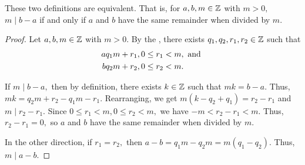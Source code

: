 \documentclass{ximera}
\begin{document}
\begin{proposition}\label{prop:mod-defn:equiv}
These two definitions are equivalent. That is, for $a,b,m\in\mathbb Z$ with $m>0,$ $m\mid b-a$ if and only if $a$ and $b$ have the same remainder when divided by $m$.
\end{proposition}

\begin{proof}
Let $a,b,m\in\mathbb Z$ with $m> 0.$ By the , there exists $q_1,q_2,r_1,r_2\in\mathbb Z$ such that \begin{align*}
                    a & q_1 m +r_1, 0\leq r_1< m, \textnormal{ and }\\
                    b & q_2 m +r_2, 0\leq r_2< m.
                \end{align*}
            
            
                If $m\mid b-a,$ then by definition, there exists $k\in\mathbb Z$ such that $mk=b-a.$ Thus, $mk=q_2 m+r_2-q_1 m-r_1.$ Rearranging, we get 
                $m(k-q_2+q_1)=r_2-r_1$ and $m\mid r_2-r_1.$ Since 
                $0\leq r_1< m, 0\leq r_2< m,$ we have 
                $-m< r_2-r_1< m.$ Thus, $r_2-r_1=0,$ so $a$ and $b$ have the same remainder when divided by $m$.
            

            
                In the other direction, if $r_1=r_2,$ then $a-b=q_1 m-q_2 m=m(q_1-q_2).$ Thus, $m\mid a-b.$
\end{proof}
\end{document}
